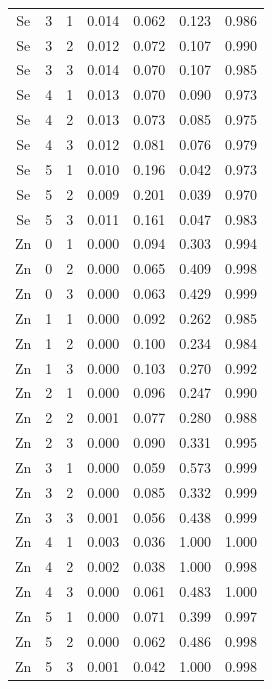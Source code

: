 \documentclass[ms, hidelinks]{uncgdissertationexp3}
\theoremstyle{plain}
\theoremstyle{definition}
\theoremstyle{remark}
\begin{document}
\begin{longtable}{ccccccc}
  Se & 3 & 1 & 0.014 & 0.062 & 0.123 & 0.986\\
  \rowcolor{gray!6}  Se & 3 & 2 & 0.012 & 0.072 & 0.107 & 0.990\\
  Se & 3 & 3 & 0.014 & 0.070 & 0.107 & 0.985\\
  \rowcolor{gray!6}  Se & 4 & 1 & 0.013 & 0.070 & 0.090 & 0.973\\
  Se & 4 & 2 & 0.013 & 0.073 & 0.085 & 0.975\\
  \rowcolor{gray!6}  Se & 4 & 3 & 0.012 & 0.081 & 0.076 & 0.979\\
  Se & 5 & 1 & 0.010 & 0.196 & 0.042 & 0.973\\
  \rowcolor{gray!6}  Se & 5 & 2 & 0.009 & 0.201 & 0.039 & 0.970\\
  Se & 5 & 3 & 0.011 & 0.161 & 0.047 & 0.983\\
  \rowcolor{gray!6}  Zn & 0 & 1 & 0.000 & 0.094 & 0.303 & 0.994\\
  Zn & 0 & 2 & 0.000 & 0.065 & 0.409 & 0.998\\
  \rowcolor{gray!6}  Zn & 0 & 3 & 0.000 & 0.063 & 0.429 & 0.999\\
  Zn & 1 & 1 & 0.000 & 0.092 & 0.262 & 0.985\\
  \rowcolor{gray!6}  Zn & 1 & 2 & 0.000 & 0.100 & 0.234 & 0.984\\
  Zn & 1 & 3 & 0.000 & 0.103 & 0.270 & 0.992\\
  \rowcolor{gray!6}  Zn & 2 & 1 & 0.000 & 0.096 & 0.247 & 0.990\\
  Zn & 2 & 2 & 0.001 & 0.077 & 0.280 & 0.988\\
  \rowcolor{gray!6}  Zn & 2 & 3 & 0.000 & 0.090 & 0.331 & 0.995\\
  Zn & 3 & 1 & 0.000 & 0.059 & 0.573 & 0.999\\
  \rowcolor{gray!6}  Zn & 3 & 2 & 0.000 & 0.085 & 0.332 & 0.999\\
  Zn & 3 & 3 & 0.001 & 0.056 & 0.438 & 0.999\\
  \rowcolor{gray!6}  Zn & 4 & 1 & 0.003 & 0.036 & 1.000 & 1.000\\
  Zn & 4 & 2 & 0.002 & 0.038 & 1.000 & 0.998\\
  \rowcolor{gray!6}  Zn & 4 & 3 & 0.000 & 0.061 & 0.483 & 1.000\\
  Zn & 5 & 1 & 0.000 & 0.071 & 0.399 & 0.997\\
  \rowcolor{gray!6}  Zn & 5 & 2 & 0.000 & 0.062 & 0.486 & 0.998\\
  Zn & 5 & 3 & 0.001 & 0.042 & 1.000 & 0.998\\*
  \end{longtable}
\end{document}
